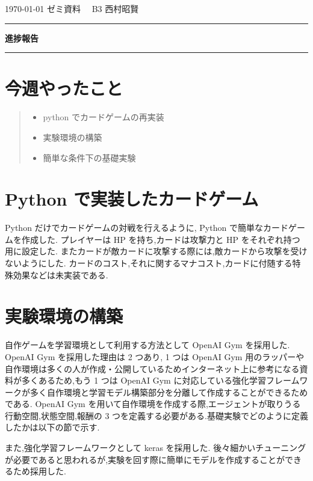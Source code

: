 \documentclass{jarticle}     %
\begin{document}
  \noindent
  \onecolumn
  \hspace{1em}

  \today
  ゼミ資料
  \hfill
  \ \ B3 西村昭賢 

  \vspace{2mm}
  \hrule
  \begin{center}
  {\Large \bf 進捗報告}
  \end{center}
  \hrule
  \vspace{3mm}


\section{今週やったこと}

\begin{quote}
  \begin{itemize}
   \item python でカードゲームの再実装
   \item 実験環境の構築
   \item 簡単な条件下の基礎実験
  \end{itemize}
 \end{quote}

\section{Python で実装したカードゲーム}
 Python だけでカードゲームの対戦を行えるように, Python で簡単なカードゲームを作成した.
 プレイヤーは HP を持ち,カードは攻撃力と HP をそれぞれ持つ用に設定した.
 またカードが敵カードに攻撃する際には,敵カードから攻撃を受けないようにした.
 カードのコスト,それに関するマナコスト,カードに付随する特殊効果などは未実装である.

\section{実験環境の構築}
自作ゲームを学習環境として利用する方法として OpenAI Gym を採用した.
OpenAI Gym を採用した理由は 2 つあり, 1 つは OpenAI Gym 用のラッパーや自作環境は多くの人が作成・公開しているためインターネット上に参考になる資料が多くあるため,もう 1 つは OpenAI Gym に対応している強化学習フレームワークが多く自作環境と学習モデル構築部分を分離して作成することができるためである.
OpenAI Gym を用いて自作環境を作成する際,エージェントが取りうる行動空間,状態空間,報酬の 3 つを定義する必要がある.基礎実験でどのように定義したかは以下の節で示す.
\par
また,強化学習フレームワークとして keras を採用した.
後々細かいチューニングが必要であると思われるが,実験を回す際に簡単にモデルを作成することができるため採用した.
\end{document}

